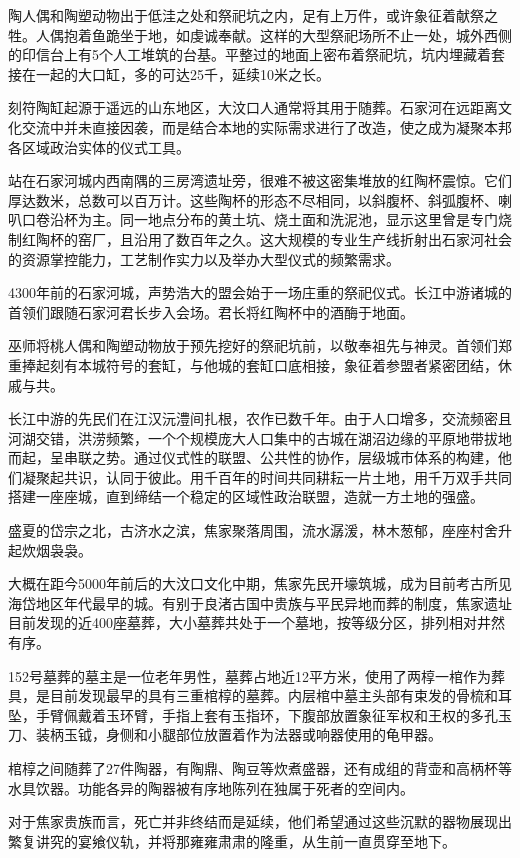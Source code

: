 陶人偶和陶塑动物出于低洼之处和祭祀坑之内，足有上万件，或许象征着献祭之牲。人偶抱着鱼跪坐于地，如虔诚奉献。这样的大型祭祀场所不止一处，城外西侧的印信台上有5个人工堆筑的台基。平整过的地面上密布着祭祀坑，坑内埋藏着套接在一起的大口缸，多的可达25千，延续10米之长。

刻符陶缸起源于遥远的山东地区，大汶口人通常将其用于随葬。石家河在远距离文化交流中并未直接因袭，而是结合本地的实际需求进行了改造，使之成为凝聚本邦各区域政治实体的仪式工具。

站在石家河城内西南隅的三房湾遗址旁，很难不被这密集堆放的红陶杯震惊。它们厚达数米，总数可以百万计。这些陶杯的形态不尽相同，以斜腹杯、斜弧腹杯、喇叭口卷沿杯为主。同一地点分布的黄土坑、烧土面和洗泥池，显示这里曾是专门烧制红陶杯的窑厂，且沿用了数百年之久。这大规模的专业生产线折射出石家河社会的资源掌控能力，工艺制作实力以及举办大型仪式的频繁需求。

4300年前的石家河城，声势浩大的盟会始于一场庄重的祭祀仪式。长江中游诸城的首领们跟随石家河君长步入会场。君长将红陶杯中的酒酶于地面。

巫师将桃人偶和陶塑动物放于预先挖好的祭祀坑前，以敬奉祖先与神灵。首领们郑重捧起刻有本城符号的套缸，与他城的套缸口底相接，象征着参盟者紧密团结，休戚与共。

长江中游的先民们在江汉沅澧间扎根，农作已数千年。由于人口增多，交流频密且河湖交错，洪涝频繁，一个个规模庞大人口集中的古城在湖沼边缘的平原地带拔地而起，呈串联之势。通过仪式性的联盟、公共性的协作，层级城市体系的构建，他们凝聚起共识，认同于彼此。用千百年的时间共同耕耘一片土地，用千万双手共同搭建一座座城，直到缔结一个稳定的区域性政治联盟，造就一方土地的强盛。

盛夏的岱宗之北，古济水之滨，焦家聚落周围，流水潺湲，林木葱郁，座座村舍升起炊烟袅袅。

大概在距今5000年前后的大汶口文化中期，焦家先民开壕筑城，成为目前考古所见海岱地区年代最早的城。有别于良渚古国中贵族与平民异地而葬的制度，焦家遗址目前发现的近400座墓葬，大小墓葬共处于一个墓地，按等级分区，排列相对井然有序。

152号墓葬的墓主是一位老年男性，墓葬占地近12平方米，使用了两椁一棺作为葬具，是目前发现最早的具有三重棺椁的墓葬。内层棺中墓主头部有束发的骨梳和耳坠，手臂佩戴着玉环臂，手指上套有玉指环，下腹部放置象征军权和王权的多孔玉刀、装柄玉钺，身侧和小腿部位放置着作为法器或响器使用的龟甲器。

棺椁之间随葬了27件陶器，有陶鼎、陶豆等炊煮盛器，还有成组的背壶和高柄杯等水具饮器。功能各异的陶器被有序地陈列在独属于死者的空间内。

对于焦家贵族而言，死亡并非终结而是延续，他们希望通过这些沉默的器物展现出繁复讲究的宴飨仪轨，并将那雍雍肃肃的隆重，从生前一直贯穿至地下。

